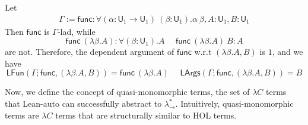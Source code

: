 \begin{example} Let
  \begin{align*}
    \Gamma := \mathsf{func} : \forall (\alpha : \mathsf{U}_1 \to \mathsf{U}_1) \ (\beta : \mathsf{U}_1). \alpha \ \beta,
      A : \mathsf{U}_1, B : \mathsf{U}_1 
  \end{align*}
  Then $\mathsf{func}$ is $\Gamma$-lad, while
  $$\mathsf{func} \ (\lambda \beta. A) : \forall (\beta : \mathsf{U}_1). A \ \ \ \ \ \
  \mathsf{func} \ (\lambda \beta. A) \ B : A$$
  are not. Therefore, the dependent argument of $\mathsf{func}$ w.r.t $(\lambda \beta. A, B)$ is $1$, and
  we have
  $$\mathsf{LFun}(\Gamma; \mathsf{func}, (\lambda \beta. A, B)) = \mathsf{func} \ (\lambda \beta . A) \ \ \ \ \ \
  \mathsf{LArgs}(\Gamma; \mathsf{func}, (\lambda \beta. A, B)) = B$$
\end{example}

\noindent Now, we define the concept of quasi-monomorphic terms, the set of $\lambda C$ terms
  that Lean-auto can successfully abstract to $\lambda_\to^*$. Intuitively, quasi-monomorphic
  terms are $\lambda C$ terms that are structurally similar to HOL terms.

